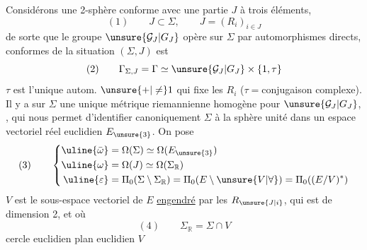 Considérons une 2-sphère conforme \inserted{$\Sigma$} avec une partie $J$ à trois éléments,
\[
(1)\qquad J\subset\Sigma,\qquad J=(R_i)_{i\in J}
\]
de sorte que le groupe $\unsure{\mathcal G_J|G_J}$ opère sur $\Sigma$ par automorphismes  directs,    conformes de la situation $(\Sigma,J)$ est
\[
(2)\qquad\Gamma_{\Sigma,J}=\Gamma\simeq\unsure{\mathcal G_J|G_J}\times\{1,\tau\}
\]
$\tau$ est l'unique  autom. $\unsure{+|\ne}1$  qui fixe les $R_i$  ($\tau={}$conjugaison complexe).
Il y a sur $\Sigma$ une unique métrique riemannienne homogène  pour $\unsure{\mathcal G_J|G_J}$,  , qui nous permet d'identifier canoniquement $\Sigma$ à la sphère unité dans un espace vectoriel réel euclidien $E_{\unsure{3}}$. On pose
\[
(3)\qquad\left\{\begin{aligned}
\uline{\bar\omega}&=\Omega(\Sigma)\simeq\Omega(E_{\unsure{3}})\\
\uline{\omega}&=\Omega(J)\simeq\Omega(\Sigma_{\mathbb R})\\
\uline{\varepsilon}&=\Pi_0(\Sigma\setminus\Sigma_{\mathbb R})=\Pi_0(E\setminus\unsure{V|\forall})=\Pi_0((E/V)^*)
\end{aligned}\right.
\]
$V$ est le sous-espace vectoriel de $E$ \uline{engendré} par les $R_{\unsure{J|i}}$, qui est de dimension 2, et où
\[
(4)\qquad\Sigma_{\mathbb R}=\Sigma\cap V
\]
cercle euclidien  plan euclidien $V$

